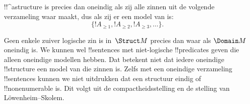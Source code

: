 \documentclass[../../../include/open-logic-section]{subfiles}
\begin{document}
\begin{prop}
!!^a{structure} is precies dan oneindig als zij alle zinnen uit de
volgende verzameling waar maakt, dus als zij er een model van is:
\[
\{!A_{\ge 1}, !A_{\ge 2}, !A_{\ge 3}, \dots \}.
\]
\end{prop}

Geen enkele zuiver logische zin is in~$\Struct M$ precies dan waar als
$\Domain M$ oneindig is. We kunnen wel !!{sentence}s met niet-logische
!!{predicate}s geven die alleen oneindige modellen hebben. Dat betekent
niet dat iedere oneindige !!{structure} een model van die zinnen is.
Zelfs met een oneindige verzameling !!{sentence}s kunnen we niet
uitdrukken dat een structuur eindig of !!{nonenumerable} is. Dit volgt
uit de compactheidsstelling en de stelling van
L\"owenheim--Skolem.
\end{document}
